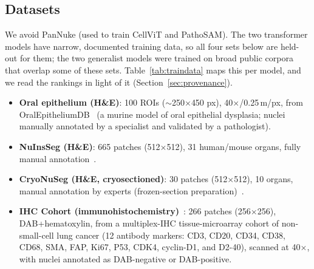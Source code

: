 \documentclass[10pt,conference]{IEEEtran}
\begin{document}
\subsection{Datasets}
\label{sec:datasets}
We avoid PanNuke (used to train CellViT and PathoSAM). The two transformer models
have narrow, documented training data, so all four sets below are held-out for
them; the two generalist models were trained on broad public corpora that overlap
some of these sets. Table~\ref{tab:traindata} maps this per model, and we read the
rankings in light of it (Section~\ref{sec:provenance}).
\begin{itemize}
  \item \textbf{Oral epithelium (H\&E)}: 100 ROIs ($\sim$250$\times$450 px), 40$\times$/0.25\,\textmu m/px,
        from OralEpitheliumDB~\cite{oralepitheliumdb} (a murine model of oral epithelial dysplasia;
        nuclei manually annotated by a specialist and validated by a pathologist).
  \item \textbf{NuInsSeg (H\&E)}: 665 patches (512$\times$512), 31 human/mouse organs, fully manual annotation~\cite{nuinsseg}.
  \item \textbf{CryoNuSeg (H\&E, cryosectioned)}: 30 patches (512$\times$512), 10 organs, manual annotation by experts (frozen-section preparation)~\cite{cryonuseg}.
  \item \textbf{IHC Cohort (immunohistochemistry)}~\cite{ihctma}: 266 patches (256$\times$256),
        DAB+hematoxylin, from a multiplex-IHC tissue-microarray cohort of
        non-small-cell lung cancer (12 antibody markers: CD3, CD20, CD34, CD38,
        CD68, SMA, FAP, Ki67, P53, CDK4, cyclin-D1, and D2-40), scanned at
        40$\times$, with nuclei annotated as DAB-negative or
        DAB-positive.
\end{itemize}
\end{document}
